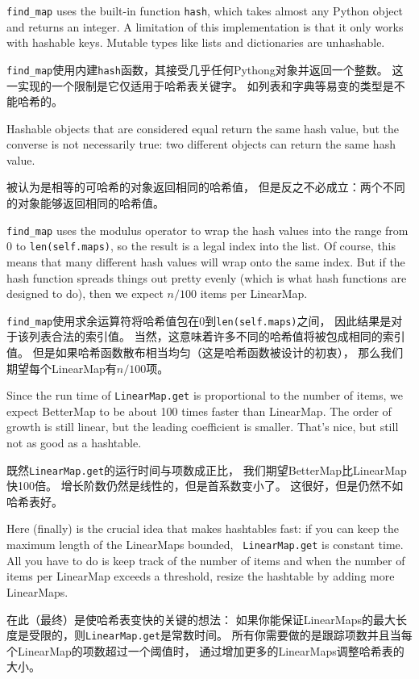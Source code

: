 \documentclass[10pt]{book}
\begin{document}
\begin{CJK}{UTF8}{gbsn}
\verb"find_map" uses the built-in function {\tt hash}, which takes
almost any Python object and returns an integer.  A limitation of this
implementation is that it only works with hashable keys.  Mutable
types like lists and dictionaries are unhashable.

\verb"find_map"使用内建{\tt hash}函数，其接受几乎任何Pythong对象并返回一个整数。
这一实现的一个限制是它仅适用于哈希表关键字。
如列表和字典等易变的类型是不能哈希的。

Hashable objects that are considered equal return the same hash value,
but the converse is not necessarily true: two different objects
can return the same hash value.

被认为是相等的可哈希的对象返回相同的哈希值，
但是反之不必成立：两个不同的对象能够返回相同的哈希值。

\verb"find_map" uses the modulus operator to wrap the hash values
into the range from 0 to {\tt len(self.maps)}, so the result is a legal
index into the list.  Of course, this means that many different
hash values will wrap onto the same index.  But if the hash function
spreads things out pretty evenly (which is what hash functions
are designed to do), then we expect $n/100$ items per LinearMap.

\verb"find_map"使用求余运算符将哈希值包在0到{\tt len(self.maps)}之间，
因此结果是对于该列表合法的索引值。
当然，这意味着许多不同的哈希值将被包成相同的索引值。
但是如果哈希函数散布相当均匀（这是哈希函数被设计的初衷），
那么我们期望每个LinearMap有$n/100$项。

Since the run time of {\tt LinearMap.get} is proportional to the
number of items, we expect BetterMap to be about 100 times faster
than LinearMap.  The order of growth is still linear, but the
leading coefficient is smaller.  That's nice, but still not
as good as a hashtable.

既然{\tt LinearMap.get}的运行时间与项数成正比，
我们期望BetterMap比LinearMap快100倍。
增长阶数仍然是线性的，但是首系数变小了。
这很好，但是仍然不如哈希表好。

Here (finally) is the crucial idea that makes hashtables fast: if you
can keep the maximum length of the LinearMaps bounded, {\tt
  LinearMap.get} is constant time.  All you have to do is keep track
of the number of items and when the number of
items per LinearMap exceeds a threshold, resize the hashtable by
adding more LinearMaps.

在此（最终）是使哈希表变快的关键的想法：
如果你能保证LinearMaps的最大长度是受限的，则{\tt LinearMap.get}是常数时间。
所有你需要做的是跟踪项数并且当每个LinearMap的项数超过一个阈值时，
通过增加更多的LinearMaps调整哈希表的大小。


\end{CJK}
\end{document}
